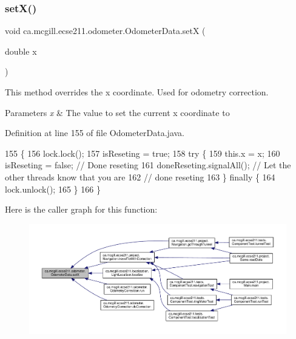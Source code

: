 \subsubsection{\texorpdfstring{set\+X()}{setX()}}
{\footnotesize\ttfamily void ca.\+mcgill.\+ecse211.\+odometer.\+Odometer\+Data.\+setX (\begin{DoxyParamCaption}\item[{double}]{x }\end{DoxyParamCaption})}

This method overrides the x coordinate. Used for odometry correction.


\begin{DoxyParams}{Parameters}
{\em x} & The value to set the current x coordinate to \\
\hline
\end{DoxyParams}


Definition at line 155 of file Odometer\+Data.\+java.


\begin{DoxyCode}
155                              \{
156     lock.lock();
157     isReseting = \textcolor{keyword}{true};
158     \textcolor{keywordflow}{try} \{
159       this.x = x;
160       isReseting = \textcolor{keyword}{false}; \textcolor{comment}{// Done reseting}
161       doneReseting.signalAll(); \textcolor{comment}{// Let the other threads know that you are}
162                                 \textcolor{comment}{// done reseting}
163     \} \textcolor{keywordflow}{finally} \{
164       lock.unlock();
165     \}
166   \}
\end{DoxyCode}
Here is the caller graph for this function\+:
\nopagebreak
\begin{figure}[H]
\begin{center}
\leavevmode
\includegraphics[width=350pt]{classca_1_1mcgill_1_1ecse211_1_1odometer_1_1_odometer_data_a2911d7215e47f3064defe016b46bfeef_icgraph}
\end{center}
\end{figure}
\mbox{\label{classca_1_1mcgill_1_1ecse211_1_1odometer_1_1_odometer_data_a2ebc18a13aea6276122d9ef4ee100bb9}} 
